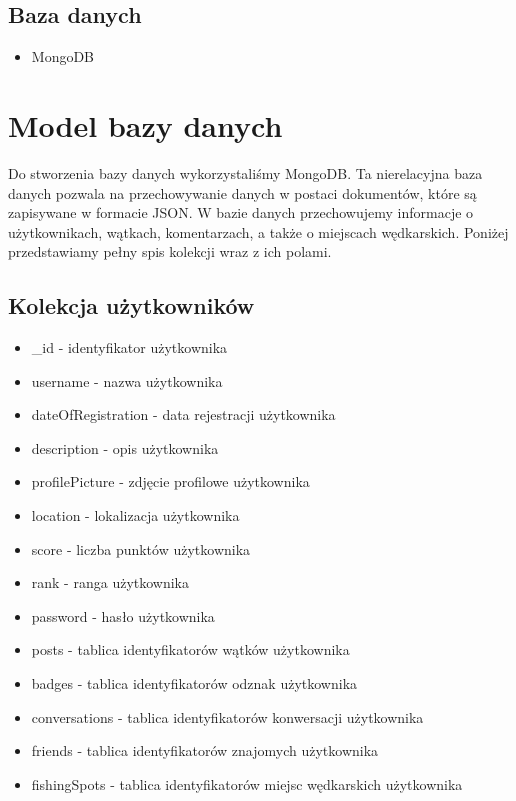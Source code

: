 \documentclass{article}
\begin{document}
\subsection{Baza danych}
\begin{itemize}
  \item MongoDB
\end{itemize}
\section{Model bazy danych}
Do stworzenia bazy danych wykorzystaliśmy MongoDB. Ta nierelacyjna baza danych pozwala na przechowywanie danych w postaci dokumentów, które są zapisywane w formacie JSON. W bazie danych przechowujemy informacje o użytkownikach, wątkach, komentarzach, a także o miejscach wędkarskich. Poniżej przedstawiamy pełny spis kolekcji wraz z ich polami.
\subsection{Kolekcja użytkowników}
\begin{itemize}
  \item \_id - identyfikator użytkownika
  \item username - nazwa użytkownika
  \item dateOfRegistration - data rejestracji użytkownika
  \item description - opis użytkownika
  \item profilePicture - zdjęcie profilowe użytkownika
  \item location - lokalizacja użytkownika
  \item score - liczba punktów użytkownika
  \item rank - ranga użytkownika
  \item password - hasło użytkownika
  \item posts - tablica identyfikatorów wątków użytkownika
  \item badges - tablica identyfikatorów odznak użytkownika
  \item conversations - tablica identyfikatorów konwersacji użytkownika
  \item friends - tablica identyfikatorów znajomych użytkownika
  \item fishingSpots - tablica identyfikatorów miejsc wędkarskich użytkownika
\end{itemize}
\end{document}
